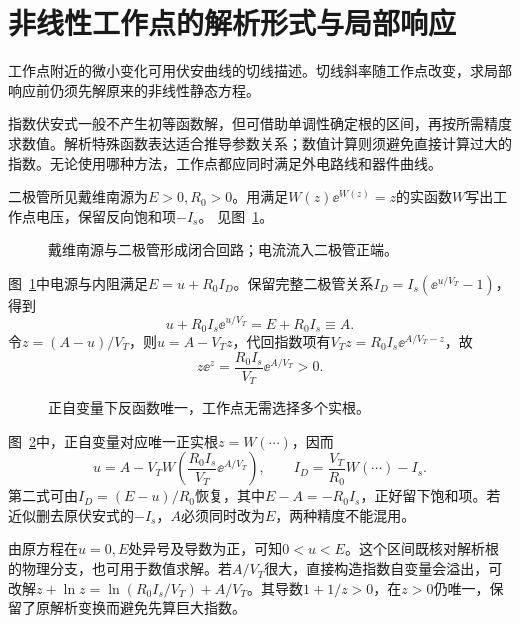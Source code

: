\section{非线性工作点的解析形式与局部响应}
工作点附近的微小变化可用伏安曲线的切线描述。切线斜率随工作点改变，求局部响应前仍须先解原来的非线性静态方程。

指数伏安式一般不产生初等函数解，但可借助单调性确定根的区间，再按所需精度求数值。解析特殊函数表达适合推导参数关系；数值计算则须避免直接计算过大的指数。无论使用哪种方法，工作点都应同时满足外电路线和器件曲线。

\begin{example}[指数二极管的精确工作点]\label{ex:c4-lambert}
二极管所见戴维南源为$E>0,R_0>0$。用满足$W(z)\ee^{W(z)}=z$的实函数$W$写出工作点电压，保留反向饱和项$-I_s$。 见图~\ref{fig:c4-lambert-q}。
\end{example}

\begin{figure}[H]\centering
{}
\caption{戴维南源与二极管形成闭合回路；电流流入二极管正端。}\label{fig:c4-lambert-q}
\end{figure}
\begin{solution}
图~\ref{fig:c4-lambert-q}中电源与内阻满足$E=u+R_0I_D$。保留完整二极管关系$I_D=I_s(\ee^{u/V_T}-1)$，得到
\[
 u+R_0I_s\ee^{u/V_T}=E+R_0I_s\equiv A.
\]
令$z=(A-u)/V_T$，则$u=A-V_Tz$，代回指数项有$V_Tz=R_0I_s\ee^{A/V_T-z}$，故
\[
 z\ee^z=\frac{R_0I_s}{V_T}\ee^{A/V_T}>0.
\]
\begin{figure}[H]\centering
{}
\caption{正自变量下反函数唯一，工作点无需选择多个实根。}\label{fig:c4-lambert-s}
\end{figure}
图~\ref{fig:c4-lambert-s}中，正自变量对应唯一正实根$z=W(\cdots)$，因而
\[
 \boxed{u=A-V_TW\!\left(\frac{R_0I_s}{V_T}\ee^{A/V_T}\right)},\qquad
 \boxed{I_D=\frac{V_T}{R_0}W(\cdots)-I_s}.
\]
第二式可由$I_D=(E-u)/R_0$恢复，其中$E-A=-R_0I_s$，正好留下饱和项。若近似删去原伏安式的$-I_s$，$A$必须同时改为$E$，两种精度不能混用。

由原方程在$u=0,E$处异号及导数为正，可知$0<u<E$。这个区间既核对解析根的物理分支，也可用于数值求解。若$A/V_T$很大，直接构造指数自变量会溢出，可改解$z+\ln z=\ln(R_0I_s/V_T)+A/V_T$。其导数$1+1/z>0$，在$z>0$仍唯一，保留了原解析变换而避免先算巨大指数。
\end{solution}

